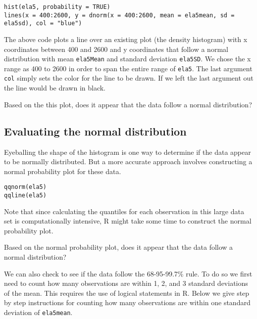 \documentclass[11pt]{article}
\begin{document}
\begin{lstlisting}
hist(ela5, probability = TRUE)
lines(x = 400:2600, y = dnorm(x = 400:2600, mean = ela5mean, sd = ela5sd), col = "blue")
\end{lstlisting}

The above code plots a line over an existing plot (the density histogram) with x coordinates between 400 and 2600 and y coordinates that follow a normal distribution with mean \texttt{ela5Mean} and standard deviation \texttt{ela5SD}. We chose the x range as 400 to 2600 in order to span the entire range of \texttt{ela5}. The last argument \texttt{col} simply sets the color for the line to be drawn. If we left the last argument out the line would be drawn in black.

\begin{exercise}
Based on the this plot, does it appear that the data follow a normal distribution?
\end{exercise}

%
\subsection*{Evaluating the normal distribution}

Eyeballing the shape of the histogram is one way to determine if the data appear to be normally distributed. But a more accurate approach involves constructing a normal probability plot for these data.

\begin{lstlisting}
qqnorm(ela5)
qqline(ela5)
\end{lstlisting}

Note that since calculating the quantiles for each observation in this large data set is computationally intensive, R might take some time to construct the normal probability plot.

\begin{exercise}
Based on the normal probability plot, does it appear that the data follow a normal distribution?
\end{exercise}

We can also check to see if the data follow the 68-95-99.7\% rule. To do so we first need to count how many observations are within 1, 2, and 3 standard deviations of the mean. This requires the use of logical statements in R. Below we give step by step instructions for counting how many observations are within one standard deviation of \texttt{ela5mean}.
\end{document}
